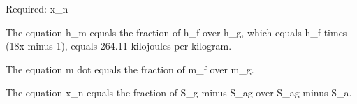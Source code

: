 Required: x_n

The equation h_m equals the fraction of h_f over h_g, which equals h_f times (18x minus 1), equals 264.11 kilojoules per kilogram.

The equation m dot equals the fraction of m_f over m_g.

The equation x_n equals the fraction of S_g minus S_ag over S_ag minus S_a.